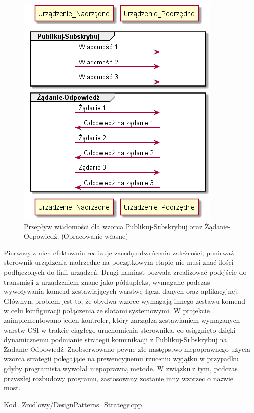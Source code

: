         \begin{figure}[h!]
            \centering
            \includegraphics[scale=0.75]{out/Diagramy/PublishSubscribe_RequestResponse.png}
            \caption{Przepływ wiadomości dla wzorca Publikuj-Subskrybuj oraz Żądanie-Odpowiedź.
                \newline(Opracowanie własne)}
        \end{figure}

        Pierwszy z nich efektownie realizuje zasadę odwrócenia zależności, ponieważ sterownik urządzenia nadrzędne na początkowym etapie nie musi znać
        ilości podłączonych do linii urządzeń. Drugi namiast pozwala zrealizować podejście do transmisji z urządzeniem znane jako półdupleks, wymagane podczas
        wywoływania komend zestawiających warstwę łącza danych oraz aplikacyjnej. Głównym problem jest to, że obydwa wzorce wymagają innego zestawu komend w celu
        konfiguracji połączenia ze slotami systemowymi. W projekcie zaimplementowano jeden kontroler, który zarządza zestawianiem wymaganych warstw OSI w trakcie
        ciągłego uruchomienia sterownika, co osiągnięto dzięki dynamicznemu podmianie strategii komunikacji z Publikuj-Subskrybuj na Żadanie-Odpowiedź.
        Zaobserwowano pewne złe następstwo niepoprawnego użycia wzorca strategii polegające na prewencyjnemu rzuceniu wyjątku w przypadku gdyby programista wywołał niepoprawną metode.
        W związku z tym, podczas przyszłej rozbudowy programu, zastosowany zostanie inny wzorzec o nazwie most.
        \newpage
        
        {Kod_Zrodlowy/DesignPatterns_Strategy.cpp}
    \newpage

